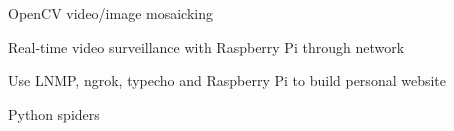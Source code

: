 

\begin{cventries}

  \cventry
    {} %
    {} %
    {} %
    {} %
    {
      \begin{cvitems} %
        \item {OpenCV video/image mosaicking}
        \item {Real-time video surveillance with Raspberry Pi through network}
        \item {Use LNMP, ngrok, typecho and Raspberry Pi to build personal website}
		\item {Python spiders}
      \end{cvitems}
    }

\end{cventries}
